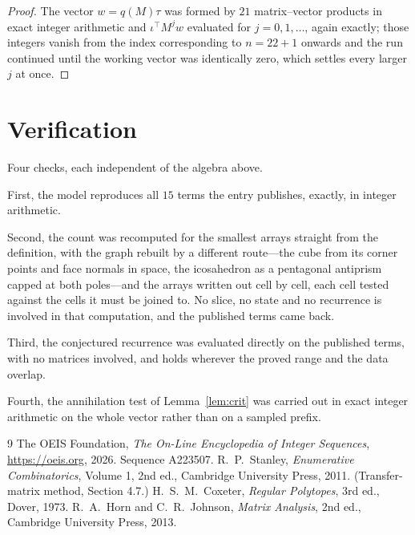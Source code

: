 \documentclass[11pt,a4paper]{article}
\theoremstyle{plain}
\theoremstyle{definition}
\begin{document}
\begin{proof}
The vector $w=q(M)\tau$ was formed by $21$ matrix--vector products in exact integer
arithmetic and $\iota^{\!\top}M^{j}w$ evaluated for $j=0,1,\dots$, again exactly; those
integers vanish from the index corresponding to $n=22+1$ onwards and the run continued
until the working vector was identically zero, which settles every larger $j$ at once.
\end{proof}

\section{Verification}

Four checks, each independent of the algebra above.

First, the model reproduces all $15$ terms the entry publishes, exactly, in integer
arithmetic.

Second, the count was recomputed for the smallest arrays straight from the definition, with the
graph rebuilt by a different route---the cube from its corner points and face normals in space,
the icosahedron as a pentagonal antiprism capped at both poles---and the arrays written out cell
by cell, each cell tested against the cells it must be joined to. No slice, no state and no
recurrence is involved in that computation, and the published terms came back.

Third, the conjectured recurrence was evaluated directly on the published terms, with no
matrices involved, and holds wherever the proved range and the data overlap.

Fourth, the annihilation test of Lemma~\ref{lem:crit} was carried out in exact integer
arithmetic on the whole vector rather than on a sampled prefix.

\begin{thebibliography}{9}
 The OEIS Foundation, \emph{The On-Line Encyclopedia of Integer
Sequences}, \url{https://oeis.org}, 2026. Sequence A223507.
 R.~P.~Stanley, \emph{Enumerative Combinatorics}, Volume 1, 2nd ed.,
Cambridge University Press, 2011. (Transfer-matrix method, Section 4.7.)
 H.~S.~M.~Coxeter, \emph{Regular Polytopes}, 3rd ed., Dover, 1973.
 R.~A.~Horn and C.~R.~Johnson, \emph{Matrix Analysis}, 2nd ed., Cambridge
University Press, 2013.
\end{thebibliography}
\end{document}
